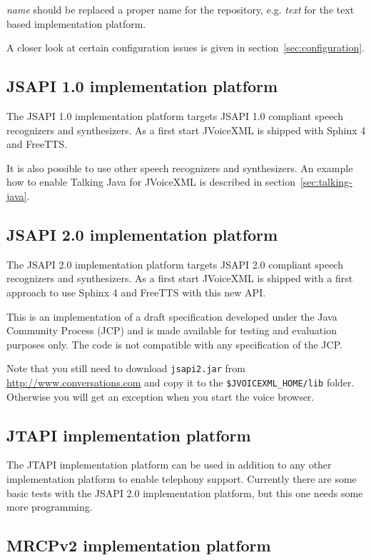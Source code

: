 \documentclass[11pt,a4paper]{article}
\begin{document}
\emph{name} should be replaced a proper name for the repository, e.g.
\emph{text} for the text based implementation platform.

A closer look at certain configuration issues is given in
section~\ref{sec:configuration}.

\subsection{JSAPI 1.0 implementation platform}

The JSAPI 1.0 implementation platform targets JSAPI 1.0 compliant speech
recognizers and synthesizers. As a first start JVoiceXML is shipped with Sphinx
4 and FreeTTS.

It is also possible to use other speech recognizers and synthesizers. An
example how to enable Talking Java for JVoiceXML is described in
section~\ref{sec:talking-java}.

\subsection{JSAPI 2.0 implementation platform}

The JSAPI 2.0 implementation platform targets JSAPI 2.0 compliant speech
recognizers and synthesizers. As a first start JVoiceXML is shipped with a
first approach to use Sphinx 4 and FreeTTS with this new API.

This is an implementation of a draft specification developed under the Java
Community Process (JCP) and is made available for testing and evaluation
purposes only. The code is not compatible with any specification of the JCP.

Note that you still need to download \lstinline{jsapi2.jar} from
\url{http://www.conversations.com} and copy it to the
\lstinline{$JVOICEXML_HOME/lib} folder. Otherwise you will get an exception
when you start the voice browser.

\subsection{JTAPI implementation platform}

The JTAPI implementation platform can be used in addition to any other
implementation platform to enable telephony support. Currently there are some
basic tests with the JSAPI 2.0 implementation platform, but this one needs some
more programming.

\subsection{MRCPv2 implementation platform}
\end{document}
